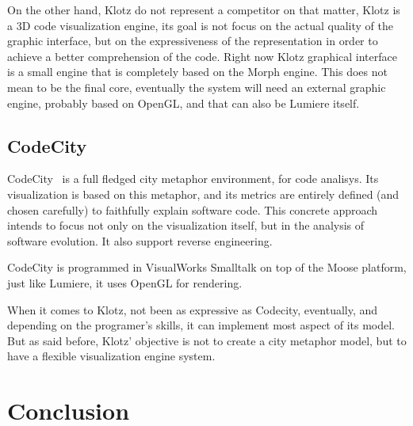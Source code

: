 \documentclass{sig-alternate}
\newcommand{\seclabel}[1]{\label{sec:#1}}
\begin{document}
On the other hand, Klotz do not represent a competitor on that 
matter, Klotz is a 3D code visualization engine, its goal is
not focus on the actual quality of the graphic interface, but 
on the expressiveness of the representation in order to achieve
a better comprehension of the code. Right now Klotz graphical
interface is a small engine that is completely based on the Morph
engine. This does not
mean to be the final core, eventually the system will need an
external graphic engine, probably based on OpenGL, and that can
also be Lumiere itself.

\subsection{CodeCity}
CodeCity~\cite{Wett08d} is a full fledged city metaphor environment, for code
analisys. Its visualization is based on this metaphor, and its
metrics are entirely defined (and chosen carefully) to faithfully
explain software code. This concrete approach intends to focus
not only on the visualization itself, but in the analysis of software
evolution. It also support  reverse engineering.

CodeCity is programmed in VisualWorks Smalltalk on top of the Moose 
platform, just like Lumiere, it uses OpenGL for rendering.

When it comes to Klotz, not been as expressive as Codecity, eventually, 
and depending on the programer's skills, it can implement most  
aspect of its model. 
But as said before, Klotz' objective is not to create a city metaphor model, but to have a flexible visualization engine system.


\section{Conclusion} \seclabel{conclusion}
\end{document}

